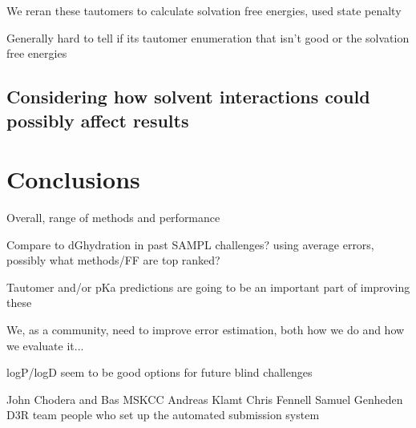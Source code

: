 We reran these tautomers to calculate solvation free energies, used state penalty %

Generally hard to tell if its tautomer enumeration that isn't good or the solvation free energies


\subsection{Considering how solvent interactions could possibly affect results} 
\label{results:7}


\section{Conclusions}
\label{conclusions}

Overall, range of methods and performance

Compare to dGhydration in past SAMPL challenges? using average errors, possibly what methods/FF are top ranked?

Tautomer and/or pKa predictions are going to be an important part of improving these

We, as a community, need to improve error estimation, both how we do and how we evaluate it...

logP/logD seem to be good options for future blind challenges

\begin{acknowledgements} %
John Chodera and Bas MSKCC
Andreas Klamt
Chris Fennell
Samuel Genheden
D3R team
people who set up the automated submission system %

\end{acknowledgements}

